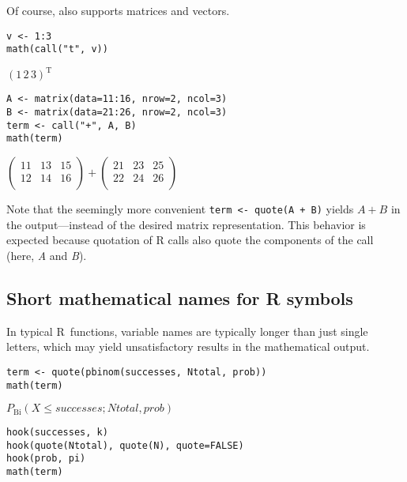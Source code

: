 Of course,  also supports matrices and vectors.

\begin{verbatim}
v <- 1:3
math(call("t", v))
\end{verbatim}

\({\left({1}{{\,}{2}{{\,}{3}}}\right)}^{\mathrm{T}}\)

\begin{verbatim}
A <- matrix(data=11:16, nrow=2, ncol=3)
B <- matrix(data=21:26, nrow=2, ncol=3)
term <- call("+", A, B)
math(term)
\end{verbatim}

\({\left(\begin{array}{ccc}11 & 13 & 15\\ 12 & 14 & 16\\ \end{array}\right)}{+}{\left(\begin{array}{ccc}21 & 23 & 25\\ 22 & 24 & 26\\ \end{array}\right)}\)

Note that the seemingly more convenient \texttt{term\ \textless{}-\ quote(A\ +\ B)} yields \(A + B\)
in the output---instead of the desired matrix representation. This behavior is
expected because quotation of R calls also quote the components of the
call (here, \emph{A} and \emph{B}).

\hypertarget{short-mathematical-names-for-r-symbols}{%
\subsection{Short mathematical names for R symbols}\label{short-mathematical-names-for-r-symbols}}

In typical R~functions, variable names are typically longer than just single
letters, which may yield unsatisfactory results in the mathematical output.

\begin{verbatim}
term <- quote(pbinom(successes, Ntotal, prob))
math(term)
\end{verbatim}

\({P}_{\mathrm{Bi}}{\left({{X}{\le}{successes}}{{;}{{Ntotal}{{,}{prob}}}}\right)}\)

\begin{verbatim}
hook(successes, k)
hook(quote(Ntotal), quote(N), quote=FALSE)
hook(prob, pi)
math(term)
\end{verbatim}

